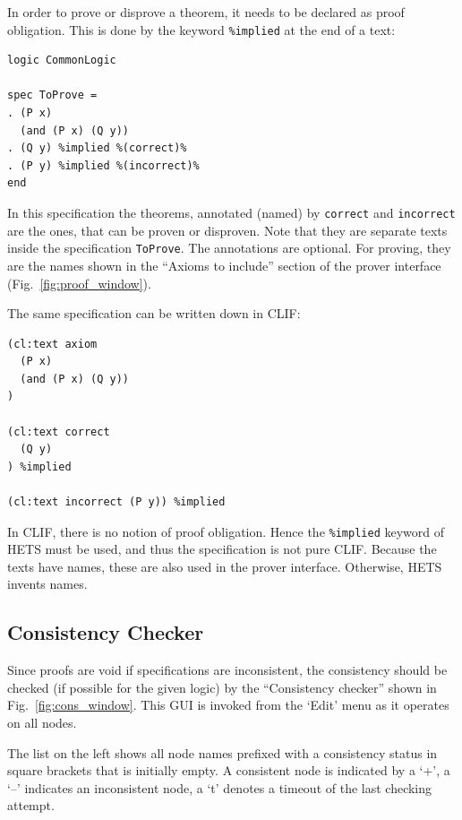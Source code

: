 \documentclass{article}
\newcommand{\normalTEXTSC}[2]{{#1\scriptsize#2}}
\newcommand     {\Hets}{\normalTEXTSC{H}{ETS}\xspace}
\begin{document}
In order to prove or disprove a theorem, it needs to be declared as proof 
obligation. This is done by the keyword \texttt{\%implied} at the end of a text:

\begin{lstlisting}[morekeywords={logic,spec,and,implied,end}]
logic CommonLogic

spec ToProve =
. (P x)
  (and (P x) (Q y))
. (Q y) %implied %(correct)%
. (P y) %implied %(incorrect)%
end
\end{lstlisting}

In this specification the theorems, annotated (named) by \texttt{correct} and 
\texttt{incorrect} are the ones, that can be proven or disproven.
Note that they are separate texts inside the specification \texttt{ToProve}.
The annotations are optional. For proving, they are the names shown in the 
``Axioms to include'' section of the prover interface 
(Fig.~\ref{fig:proof_window}).

The same specification can be written down in CLIF:
\begin{lstlisting}[language=clif,morekeywords={implied}]
(cl:text axiom
  (P x)
  (and (P x) (Q y))
)

(cl:text correct
  (Q y)
) %implied

(cl:text incorrect (P y)) %implied
\end{lstlisting}
In CLIF, there is no notion of proof obligation. Hence the \texttt{\%implied} 
keyword of \Hets must be used, and thus the specification is not pure CLIF. Because the texts have 
names, these are also used in the prover interface. Otherwise, \Hets invents 
names.

\subsection{Consistency Checker}
\label{sec:CC}
Since proofs are void if specifications are inconsistent, the consistency
should be checked (if possible for the given logic) by the ``Consistency
checker'' shown in Fig.~\ref{fig:cons_window}.  This GUI is invoked from
the `Edit' menu as it operates on all nodes.

The list on the left shows all node names prefixed with a consistency status
in square brackets that is initially empty.  A consistent node is indicated by
a `+', a `–' indicates an inconsistent node, a `t' denotes a timeout of the last
checking attempt.
\end{document}
